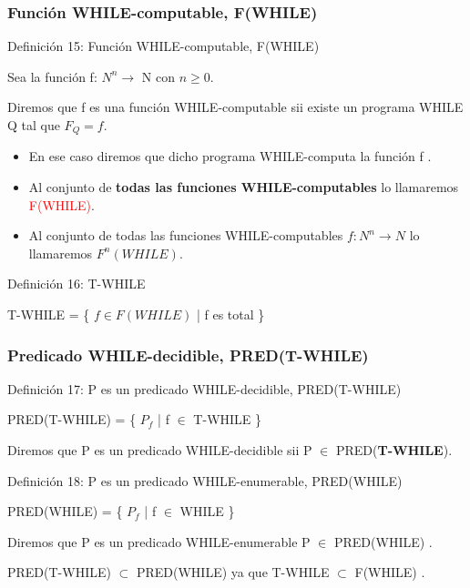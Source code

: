 \documentclass[xcolor=table]{beamer}
\begin{document}
\begin{frame}[fragile]\frametitle{Función WHILE-computable, F(WHILE)} \footnotesize

\begin{block}{Definición 15:  Función WHILE-computable, F(WHILE)}
\end{block}


Sea la función f: $N^n \rightarrow$ N con $n \geq 0$.

Diremos que f es una función WHILE-computable sii existe un programa WHILE Q tal que $F_Q = f$.

\begin{itemize}
    \item En ese caso diremos que dicho programa WHILE-computa la función f .
    \item Al conjunto de \textbf{todas las funciones WHILE-computables} lo llamaremos \textcolor{red}{F(WHILE)}.
    \item Al conjunto de todas las funciones WHILE-computables $f: N^n \rightarrow N$ lo llamaremos $F^n (WHILE)$.
\end{itemize}


\begin{block}{Definición 16:  T-WHILE}
\end{block}
 
T-WHILE = \{ $f\in F(WHILE)$ | f es total \}

\end{frame}

\begin{frame}[fragile]\frametitle{Predicado WHILE-decidible, PRED(T-WHILE)} \footnotesize

\begin{block}{Definición 17:  P es un predicado WHILE-decidible, PRED(T-WHILE)}
\end{block}
\begin{center}
PRED(T-WHILE) = \{ $P_f$ | f $\in$ T-WHILE \}    
\end{center}

Diremos que P es un predicado WHILE-decidible sii P $\in$ PRED(\textbf{T-WHILE}).


\begin{block}{Definición 18:  P es un predicado WHILE-enumerable, PRED(WHILE)}
\end{block}

\begin{center}
PRED(WHILE) = \{ $P_f$ | f $\in$ WHILE \}    
\end{center}

Diremos que P es un predicado WHILE-enumerable P $\in$ PRED(WHILE) .

\begin{center}
PRED(T-WHILE) $\subset$  PRED(WHILE) ya que T-WHILE $\subset$ F(WHILE) .
\end{center}

\end{frame}
\end{document}

